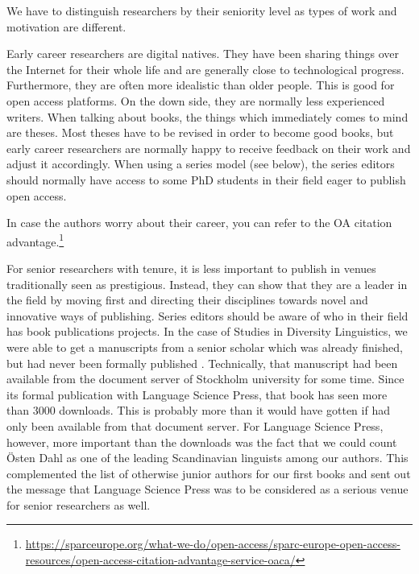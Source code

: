 \documentclass[guidelines,nonflat,modfonts] {langsci/langscibook}
\begin{document}
We have to distinguish researchers by their seniority level as types of work and motivation are different. 

Early career researchers are digital natives. They have been sharing things over the Internet for their whole life and are generally close to technological progress. Furthermore, they are often more idealistic than older people. This is good for open access platforms. On the down side, they are normally less experienced writers. When talking about books, the things which immediately comes to mind are theses. Most theses have to be revised in order to become good books, but early career researchers are normally happy to receive feedback on their work and adjust it accordingly. When using a series model (see below), the series editors should normally have access to some PhD students in their field eager to publish open access. 

In case the authors worry about their career, you can refer to the OA citation advantage.\footnote{\url{https://sparceurope.org/what-we-do/open-access/sparc-europe-open-access-resources/open-access-citation-advantage-service-oaca/}}

For senior researchers with tenure, it is less important to publish in venues traditionally seen as prestigious. Instead, they can show that they are a leader in the field by moving first and directing their disciplines towards novel and innovative ways of publishing. 
Series editors should be aware of who in their field has book publications projects. In the case of Studies in Diversity Linguistics, we were able to get a manuscripts from a senior scholar which was already finished, but had never been formally published \citep{Dahl2016}. Technically, that manuscript had been available from the document server of Stockholm university for some time. Since its formal publication with Language Science Press, that book has seen more than 3000 downloads. This is probably more than it would have gotten if had only been available from that document server. For Language Science Press, however, more important than the downloads  was the fact that we could count Östen Dahl as one of the leading Scandinavian linguists among our authors. This complemented the list of otherwise junior authors for our first books and sent out the message that Language Science Press was to be considered as a serious venue for senior researchers as well. 
\end{document}
